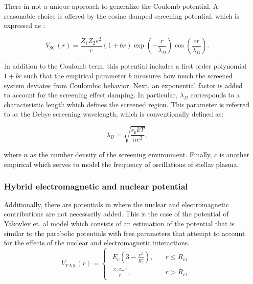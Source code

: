 \documentclass[openany]{book}
\begin{document}
There in not a unique approach to generalize the Coulomb potential. A reasonable choice is offered by the cosine damped screening potential, which is expressed as  \cite{koyuncu_soylu_2018}: 

\begin{equation}\label{eq:middleFusion_screening_dampedPotential}
	V_{\mathrm{SC}}(r) = \frac{Z_1Z_2 e^2}{r}(1+ br)\exp {\left(-\frac{r}{\lambda_D}\right)} \cos {\left(\frac{cr}{\lambda_D}\right)}. 
\end{equation}

In addition to the Coulomb term, this potential includes a first order polynomial $1 + br$ such that the empirical parameter $b$ measures how much the screened system deviates from Coulombic behavior. Next, an exponential factor is added to account for the screening effect damping. In particular, $\lambda_D$ corresponds to a characteristic length which defines the screened region. This parameter is referred to as the Debye screening wavelength, which is conventionally defined as:

\begin{equation}\label{eq:middleFusion_screening_debayWavelegth}
	\lambda_D = \sqrt{\frac{\epsilon_0kT}{ne^2}},
\end{equation}

where $n$ as the number density of the screening environment. Finally, $c$ is another empirical which serves to model the frequency of oscillations of stellar plasma. 

\subsubsection{Hybrid electromagnetic and nuclear potential} \label{sub:potential_hybrid}

Additionally, there are potentials in where the nuclear and electromagnetic contributions are not necessarily added. This is the case of the potential of Yakovlev et. al model \cite{yakovlev_beard_gasques_wiescher_2010} which consists of an estimation of the potential that is similar to the parabolic potentials with free parameters that attempt to account for the effects of the nuclear and electromagnetic interactions.  \\

\begin{equation} \label{eq:potential_Yakovlev}
	V_{\mathrm{YAK}}(r) = 	\left\{\begin{array}{l}
		\begin{split}
			E_c\left(3 - \frac{r^2}{R_c^2}\right), \quad &r \le R_{c1} \\ 
			\frac{Z_1Z_2e^2}{r}, \quad &r > R_{c1}	
		\end{split}
	\end{array}\right.
\end{equation}
\end{document}
